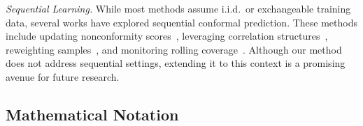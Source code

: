 \documentclass[11pt,a4paper]{article}
\begin{document}
\medskip

\noindent\emph{Sequential Learning.} While most methods assume i.i.d.\ or exchangeable training data, several works have explored sequential conformal prediction. These methods include updating nonconformity scores~\cite{Xu_2021}, leveraging correlation structures~\cite{chernozhukov_2018}, reweighting samples~\cite{Xu_2023, Barber_2023}, and monitoring rolling coverage~\cite{Gibbs_2021, Gibbs_2022, Zaffran_2022, Bastani_2022}. Although our method does not address sequential settings, extending it to this context is a promising avenue for future research.









\subsection{Mathematical Notation} 
\label{subsec:math:preliminaries}
\end{document}
